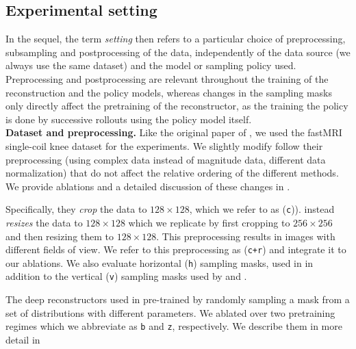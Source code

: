 \subsection{Experimental setting}
In the sequel, the term \textit{setting} then refers to a particular choice of preprocessing, subsampling and postprocessing of the data, independently of the data source (we always use the same dataset) and the model or sampling policy used.
Preprocessing and postprocessing are relevant throughout the training of the reconstruction and the policy models, whereas changes in the sampling masks only directly affect the pretraining of the reconstructor, as the training the policy is done by successive rollouts using the policy model itself.\\

\textbf{Dataset and preprocessing.} Like the original paper of \cite{bakker2020experimental}, we used the fastMRI \citep{zbontarFastMRIOpenDataset2019} single-coil knee dataset for the experiments. We slightly modify follow their preprocessing (using complex data instead of magnitude data, different data normalization) that do not affect the relative ordering of the different methods. We provide ablations and a detailed discussion of these changes in .

Specifically, they \textit{crop} the data to $128\times 128$, which we refer to as (\texttt{c})).
\citet{zhang2019reducing} instead \textit{resizes} the data to $128\times128$ which we replicate by first cropping to $256\times256$ and then resizing them to $128\times128$.
This preprocessing results in images with different fields of view. We refer to this preprocessing as (\texttt{c+r}) and integrate it to our ablations.
We also evaluate horizontal (\texttt{h}) sampling masks, used in \cite{gozcu2018learning, jin2019self} in addition to the vertical (\texttt{v}) sampling masks used by \citet{bakker2020experimental,zhang2019reducing} and \cite{pineda2020active}. 

The deep reconstructors used in \citet{pineda2020active,bakker2020experimental} pre-trained by randomly sampling a mask from a set of distributions with different parameters. We ablated over two pretraining regimes which we  abbreviate as \texttt{b} and \texttt{z}, respectively. We describe them in more detail in 

